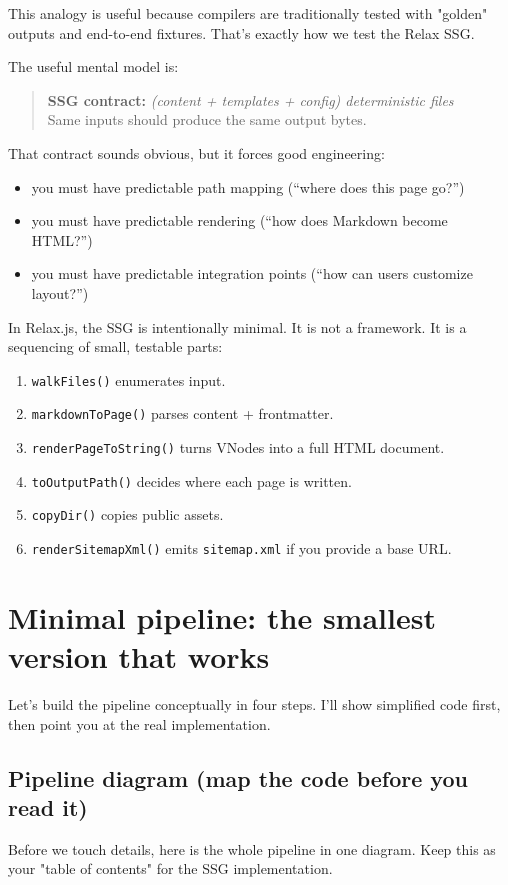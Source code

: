 This analogy is useful because compilers are traditionally tested with "golden" outputs and end-to-end fixtures.
That's exactly how we test the Relax SSG.

The useful mental model is:

\begin{quote}
\textbf{SSG contract:} \emph{(content + templates + config) \textrightarrow deterministic files}\\
Same inputs should produce the same output bytes.
\end{quote}

That contract sounds obvious, but it forces good engineering:

\begin{itemize}
  \item you must have predictable path mapping (``where does this page go?'')
  \item you must have predictable rendering (``how does Markdown become HTML?'')
  \item you must have predictable integration points (``how can users customize layout?'')
\end{itemize}

In Relax.js, the SSG is intentionally minimal.
It is not a framework.
It is a sequencing of small, testable parts:

\begin{enumerate}
  \item \texttt{walkFiles()} enumerates input.
  \item \texttt{markdownToPage()} parses content + frontmatter.
  \item \texttt{renderPageToString()} turns VNodes into a full HTML document.
  \item \texttt{toOutputPath()} decides where each page is written.
  \item \texttt{copyDir()} copies public assets.
  \item \texttt{renderSitemapXml()} emits \texttt{sitemap.xml} if you provide a base URL.
\end{enumerate}

\section{Minimal pipeline: the smallest version that works}
Let's build the pipeline conceptually in four steps.
I'll show simplified code first, then point you at the real implementation.

\subsection{Pipeline diagram (map the code before you read it)}
Before we touch details, here is the whole pipeline in one diagram.
Keep this as your "table of contents" for the SSG implementation.

